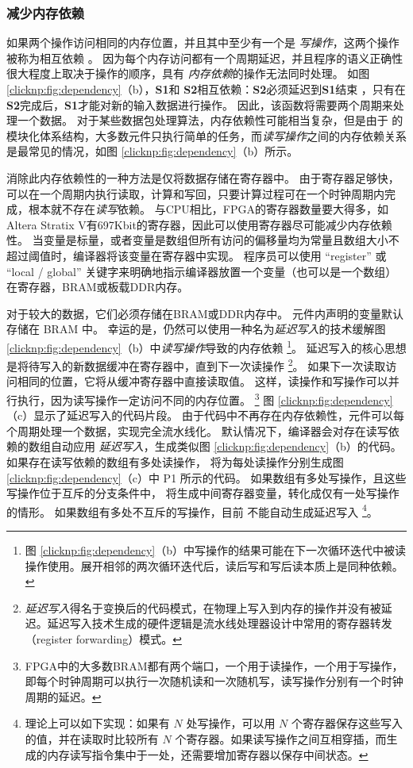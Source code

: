 \subsubsection{减少内存依赖}


如果两个操作访问相同的内存位置，并且其中至少有一个是 \textit {写操作}，这两个操作被称为相互依赖 \cite {dependence}。
因为每个内存访问都有一个周期延迟，并且程序的语义正确性很大程度上取决于操作的顺序，具有 \textit {内存依赖}的操作无法同时处理。
如图 \ref {clicknp:fig:dependency}（b），\textbf {S1}和 \textbf {S2}相互依赖：\textbf {S2}必须延迟到\textbf {S1}结束 ，只有在\textbf {S2}完成后，\textbf {S1}才能对新的输入数据进行操作。
因此，该函数将需要两个周期来处理一个数据。
对于某些数据包处理算法，内存依赖性可能相当复杂，但是由于 \name 的模块化体系结构，大多数元件只执行简单的任务，而\textit {读写操作}之间的内存依赖关系是最常见的情况，如图 \ref{clicknp:fig:dependency}（b）所示。

消除此内存依赖性的一种方法是仅将数据存储在寄存器中。
由于寄存器足够快，可以在一个周期内执行读取，计算和写回，只要计算过程可在一个时钟周期内完成，根本就不存在\textit {读写}依赖。
与CPU相比，FPGA的寄存器数量要大得多，如Altera Stratix V有697Kbit的寄存器，因此可以使用寄存器尽可能减少内存依赖性。
当变量是标量，或者变量是数组但所有访问的偏移量均为常量且数组大小不超过阈值时，\name 编译器将该变量在寄存器中实现。
程序员可以使用 ``register'' 或 ``local / global'' 关键字来明确地指示编译器放置一个变量（也可以是一个数组）在寄存器，BRAM或板载DDR内存。

对于较大的数据，它们必须存储在BRAM或DDR内存中。
元件内声明的变量默认存储在 BRAM 中。
幸运的是，仍然可以使用一种名为\textit {延迟写入}的技术缓解图 \ref {clicknp:fig:dependency}（b）中\textit {读写操作}导致的内存依赖 \footnote{图 \ref {clicknp:fig:dependency}（b）中写操作的结果可能在下一次循环迭代中被读操作使用。展开相邻的两次循环迭代后，读后写和写后读本质上是同种依赖。}。
延迟写入的核心思想是将待写入的新数据缓冲在寄存器中，直到下一次读操作 \footnote{\textit{延迟写入}得名于变换后的代码模式，在物理上写入到内存的操作并没有被延迟。延迟写入技术生成的硬件逻辑是流水线处理器设计中常用的寄存器转发（register forwarding）模式。}。
如果下一次读取访问相同的位置，它将从缓冲寄存器中直接读取值。
这样，读操作和写操作可以并行执行，因为读写操作一定访问不同的内存位置。
\footnote{FPGA中的大多数BRAM都有两个端口，一个用于读操作，一个用于写操作，即每个时钟周期可以执行一次随机读和一次随机写，读写操作分别有一个时钟周期的延迟。}
图 \ref {clicknp:fig:dependency}（c）显示了延迟写入的代码片段。
由于代码中不再存在内存依赖性，元件可以每个周期处理一个数据，实现完全流水线化。
默认情况下，\name 编译器会对存在读写依赖的数组自动应用 \textit {延迟写入}，生成类似图 \ref {clicknp:fig:dependency}（b）的代码。
如果存在读写依赖的数组有多处读操作，\name{} 将为每处读操作分别生成图 \ref {clicknp:fig:dependency}（c）中 P1 所示的代码。
如果数组有多处写操作，且这些写操作位于互斥的分支条件中，\name{} 将生成中间寄存器变量，转化成仅有一处写操作的情形。
如果数组有多处不互斥的写操作，目前 \name{} 不能自动生成延迟写入 \footnote{理论上可以如下实现：如果有 $N$ 处写操作，可以用 $N$ 个寄存器保存这些写入的值，并在读取时比较所有 $N$ 个寄存器。如果读写操作之间互相穿插，而生成的内存读写指令集中于一处，还需要增加寄存器以保存中间状态。}。


